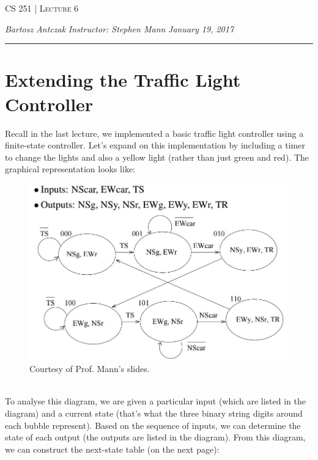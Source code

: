 \documentclass{report}
\newcommand{\lectureNum}{6}
\newcommand{\curDate}{January 19, 2017}
\newcommand{\course}{CS 251}
\newcommand{\instructor}{Stephen Mann}
\begin{document}
\begin{center}
\begin{Large}
\textsc{\course{} | Lecture \lectureNum{}}
\end{Large}
\end{center} 
\noindent \textit{Bartosz Antczak} \hfill
\textit{Instructor: \instructor{}} \hfill
\textit{\curDate{}}
\rule{\textwidth}{0.4pt}
\section{Extending the Traffic Light Controller}
Recall in the last lecture, we implemented a basic traffic light controller using a finite-state controller. Let's expand on this implementation by including a timer to change the lights and also a yellow light (rather than just green and red). The graphical representation looks like:
\begin{figure}[ht]
\begin{center}
\includegraphics[scale=0.5]{graphical_representation1.jpg}
\end{center}
\caption{Courtesy of Prof. Mann's slides.}
\end{figure}\\
To analyse this diagram, we are given a particular input (which are listed in the diagram) and a current state (that's what the three binary string digits around each bubble represent). Based on the sequence of inputs, we can determine the state of each output (the outputs are listed in the diagram). From this diagram, we can construct the next-state table (on the next page):
\end{document}
